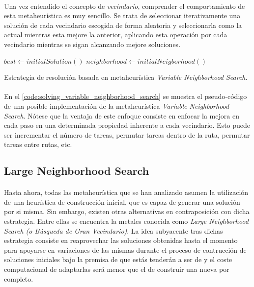 \documentclass{subfiles}
\begin{document}
        \paragraph{}
        Una vez entendido el concepto de \emph{vecindario}, comprender el comportamiento de esta metaheurística es muy sencillo. Se trata de seleccionar iterativamente una solución de cada vecindario escogida de forma aleatoria y seleccionarla como la actual mientras esta mejore la anterior, aplicando esta operación por cada vecindario mientras se sigan alcanzando mejore soluciones.

        \begin{algorithm}[ht]
          \SetAlgoLined
          $best \gets initialSolution()$\;
          $neighborhood \gets initialNeigborhood()$\;
          \caption{Estrategia de resolución basada en metaheurística \emph{Variable Neighborhood Search}.}
          \label{code:solving_variable_neighborhood_search}
        \end{algorithm}

        \paragraph{}
        En el \cref{code:solving_variable_neighborhood_search} se muestra el pseudo-código de una posible implementación de la metaheurística \emph{Variable Neighborhood Search}. Nótese que la ventaja de este enfoque consiste en enfocar la mejora en cada paso en una determinada propiedad inherente a cada vecindario. Esto puede ser incrementar el número de tareas, permutar tareas dentro de la ruta, permutar tareas entre rutas, etc.

      \subsection{Large Neighborhood Search}
      \label{sec:solving_lns}

        \paragraph{}
        Hasta ahora, todas las metaheurística que se han analizado asumen la utilización de una heurística de construcción inicial, que es capaz de generar una solución por si misma. Sin embargo, existen otras alternativas en contraposición con dicha estrategia. Entre ellas se encuentra la metales conocida como \emph{Large Neighborhood Search (o Búsqueda de Gran Vecindario)}. La idea subyacente tras dichas estrategia consiste en reaprovechar las soluciones obtenidas hasta el momento para apoyarse en variaciones de las mismas durante el proceso de contrucción de soluciones iniciales bajo la premisa de que estás tenderán a ser de  y el coste computacional de adaptarlas será menor que el de construir una nueva por completo. 
\end{document}
